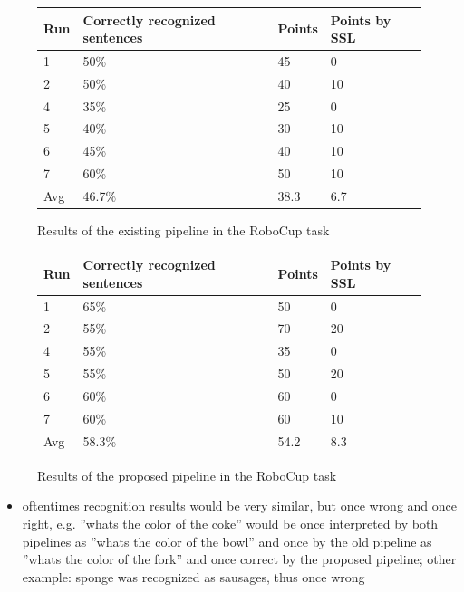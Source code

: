 \begin{figure}[ht]
	\begin{tabular}{ | l | l | l | l |}
		\hline
		Run & Correctly recognized sentences & Points & Points by SSL \\ \hline
		1 & 50\% & 45 & 0 \\ \hline
		2 & 50\% & 40 & 10 \\ \hline
		4 & 35\% & 25 &  0 \\ \hline
		5 & 40\% & 30 & 10 \\ \hline
		6 & 45\% & 40 & 10 \\ \hline
		7 & 60\% & 50 & 10 \\ \hhline{|=|=|=|=|} 
		Avg & 46.7\% & 38.3 & 6.7 \\
		\hline
	\end{tabular}
	\caption{Results of the existing pipeline in the RoboCup task}
	\label{pic:eval_task_results_old}
\end{figure}

\begin{figure}[ht]
	\begin{tabular}{ | l | l | l | l |}
		\hline
		Run & Correctly recognized sentences & Points & Points by SSL \\ \hline
		1 & 65\% & 50 &  0 \\ \hline
		2 & 55\% & 70 & 20 \\ \hline
		4 & 55\% & 35 &  0 \\ \hline
		5 & 55\% & 50 & 20 \\ \hline
		6 & 60\% & 60 &  0 \\ \hline
		7 & 60\% & 60 & 10 \\ \hhline{|=|=|=|=|} 
		Avg & 58.3\% & 54.2 & 8.3\\
		\hline
	\end{tabular}
	\caption{Results of the proposed pipeline in the RoboCup task}
	\label{pic:eval_task_results_new}
\end{figure}

\begin{itemize}
	\item oftentimes recognition results would be very similar, but once wrong and once right, e.g. ''whats the color of the coke'' would be once interpreted by both pipelines as ''whats the color of the bowl'' and once by the old pipeline as ''whats the color of the fork'' and once correct by the proposed pipeline; other example: sponge was recognized as sausages, thus once wrong
\end{itemize}


